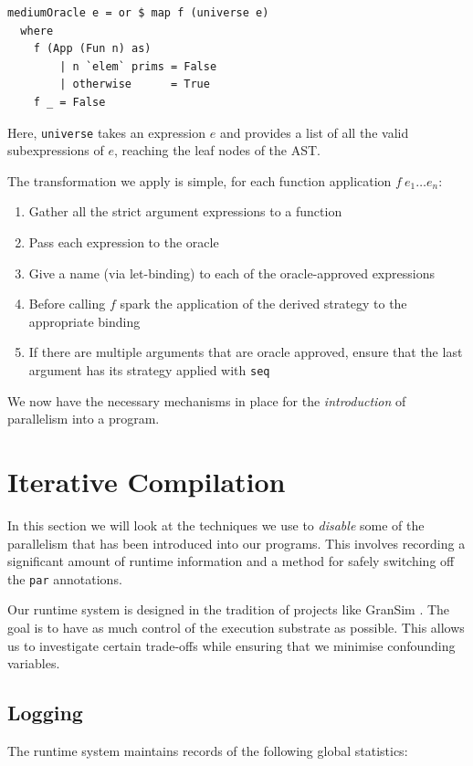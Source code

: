 \begin{verbatim}
mediumOracle e = or $ map f (universe e)
  where
    f (App (Fun n) as)
        | n `elem` prims = False
        | otherwise      = True
    f _ = False
\end{verbatim}

Here, \verb-universe- takes an expression $e$ and provides a list of all the
valid subexpressions of $e$, reaching the leaf nodes of the AST.

The transformation we apply is simple, for each function application $f \ e_{1}
\dots e_{n}$:

\begin{enumerate}
    \item Gather all the strict argument expressions to a function
    \item Pass each expression to the oracle
    \item Give a name (via let-binding) to each of the oracle-approved expressions
    \item Before calling $f$ spark the application of the derived
        strategy to the appropriate binding
    \item If there are multiple arguments that are oracle approved, ensure that
        the last argument has its strategy applied with \verb-seq-
\end{enumerate}

We now have the necessary mechanisms in place for the \emph{introduction} of
parallelism into a program.
\section{Iterative Compilation}
\label{sec:iterate}

In this section we will look at the techniques we use to \emph{disable} some of
the parallelism that has been introduced into our programs. This involves
recording a significant amount of runtime information and a method for safely
switching off the \verb-par- annotations.

Our runtime system is designed in the tradition of projects like GranSim
\citep{gransim}. The goal is to have as much control of the execution substrate
as possible. This allows us to investigate certain trade-offs while ensuring
that we minimise confounding variables.

\subsection*{Logging}
    The runtime system maintains records of the following global statistics:

